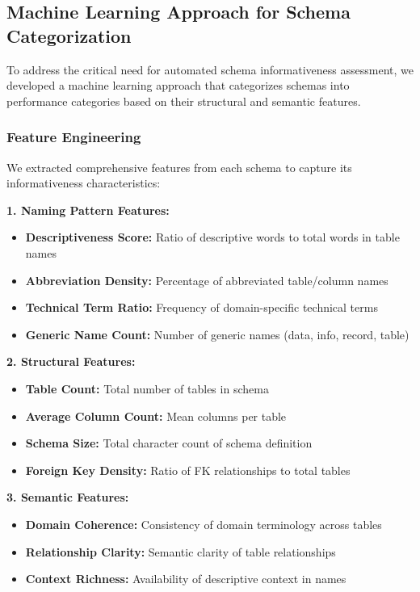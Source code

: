 
\subsection{Machine Learning Approach for Schema Categorization}

To address the critical need for automated schema informativeness assessment, we developed a machine learning approach that categorizes schemas into performance categories based on their structural and semantic features.

\subsubsection{Feature Engineering}

We extracted comprehensive features from each schema to capture its informativeness characteristics:

\textbf{1. Naming Pattern Features:}
\begin{itemize}
    \item \textbf{Descriptiveness Score:} Ratio of descriptive words to total words in table names
    \item \textbf{Abbreviation Density:} Percentage of abbreviated table/column names
    \item \textbf{Technical Term Ratio:} Frequency of domain-specific technical terms
    \item \textbf{Generic Name Count:} Number of generic names (data, info, record, table)
\end{itemize}

\textbf{2. Structural Features:}
\begin{itemize}
    \item \textbf{Table Count:} Total number of tables in schema
    \item \textbf{Average Column Count:} Mean columns per table
    \item \textbf{Schema Size:} Total character count of schema definition
    \item \textbf{Foreign Key Density:} Ratio of FK relationships to total tables
\end{itemize}

\textbf{3. Semantic Features:}
\begin{itemize}
    \item \textbf{Domain Coherence:} Consistency of domain terminology across tables
    \item \textbf{Relationship Clarity:} Semantic clarity of table relationships
    \item \textbf{Context Richness:} Availability of descriptive context in names
\end{itemize}

